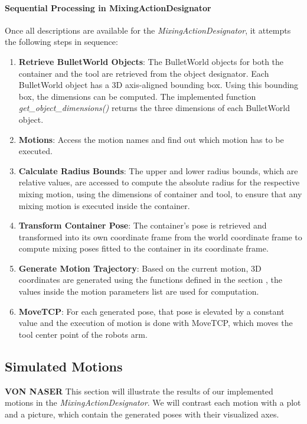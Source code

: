 \paragraph*{Sequential Processing in MixingActionDesignator}
Once all descriptions are available for the \textit{MixingActionDesignator}, it attempts the following steps in sequence:

\begin{enumerate}
    \item \textbf{Retrieve BulletWorld Objects}: The BulletWorld objects for both the container and the tool are retrieved from the object designator. 
    Each BulletWorld object has a 3D axis-aligned bounding box. Using this bounding box, the dimensions can be computed. 
    The implemented function \textit{get\_object\_dimensions()} returns the three dimensions of each BulletWorld object.
    \item \textbf{Motions}: Access the motion names and find out which motion has to be executed.
    \item \textbf{Calculate Radius Bounds}: The upper and lower radius bounds, which are relative values, 
    are accessed to compute the absolute radius for the respective mixing motion, using the dimensions of container and tool, to ensure
    that any mixing motion is executed inside the container.
    \item \textbf{Transform Container Pose}: The container's pose is retrieved and transformed into its own coordinate frame from the world coordinate frame to 
    compute mixing poses fitted to the container in its coordinate frame.
    \item \textbf{Generate Motion Trajectory}: Based on the current motion, 3D coordinates are generated using the functions defined in the section ,
    the values inside the motion parameters list are used for computation.
    \item \textbf{MoveTCP}: For each generated pose, that pose is elevated by a constant value and the execution of motion is done with MoveTCP, which 
    moves the tool center point of the robots arm.
    
\end{enumerate}
\subsection{Simulated Motions}
\label{sec:simulated motions}
\textbf{VON NASER}
This section will illustrate the results of our implemented motions in the \textit{MixingActionDesignator}. 
We will contrast each motion with a plot and a picture, which contain the generated poses with their visualized axes.

